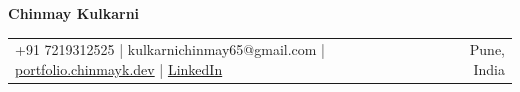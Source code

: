 {\fontsize{16pt}{18pt}\bfseries Chinmay Kulkarni}

\vspace{2pt}

\noindent
\begin{tabularx}{\linewidth}{X r}
+91 7219312525 \;|\; kulkarnichinmay65@gmail.com \;|\; \href{https://portfolio.chinmayk.dev/}{portfolio.chinmayk.dev} \;|\; \href{https://www.linkedin.com/in/chinmay-kulkarni-133920288/}{LinkedIn} & Pune, India
\end{tabularx}

\vspace{5pt}
